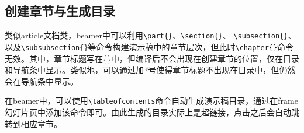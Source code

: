 \subsection{创建章节与生成目录}

类似article文档类，beamer中可以利用\texttt{\textbackslash{}part\{\}}、\texttt{\textbackslash{}section\{\}}、
\texttt{\textbackslash{}subsection\{\}}、以及\texttt{\textbackslash{}subsubsection\{\}}等命令构建演示稿中的章节层次，但此时\texttt{\textbackslash{}chapter\{\}}命令无效。其中，章节标题写在\{\}中，但编译后不会出现在创建章节的位置，仅在目录和导航条中显示。类似地，可以通过加\emph{*}号使得章节标题不出现在目录中，但仍然会在导航条中显示。

在beamer中，可以使用\texttt{\textbackslash{}tableofcontents}命令自动生成演示稿目录，通过在frame幻灯片页中添加该命令即可。由此生成的目录实际上是超链接，点击之后会自动跳转到相应章节。

